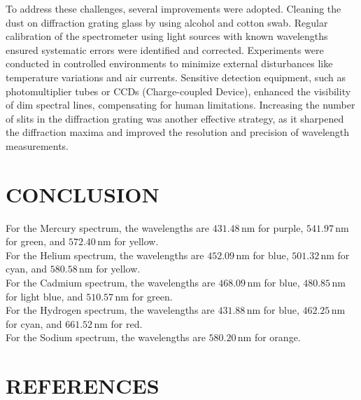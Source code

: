 \documentclass[a4paper,11pt]{article}
\begin{document}
To address these challenges, several improvements were adopted. Cleaning the dust on diffraction grating glass by using alcohol and cotton swab. Regular calibration of the spectrometer using light sources with known wavelengths ensured systematic errors were identified and corrected. Experiments were conducted in controlled environments to minimize external disturbances like temperature variations and air currents. Sensitive detection equipment, such as photomultiplier tubes or CCDs (Charge-coupled Device), enhanced the visibility of dim spectral lines, compensating for human limitations. Increasing the number of slits in the diffraction grating was another effective strategy, as it sharpened the diffraction maxima and improved the resolution and precision of wavelength measurements.\\

\newpage
\section*{\center CONCLUSION}
\label{sec:CONCLUSION}
\noindent
\qquad For the Mercury spectrum, the wavelengths are \(431.48 \, \text{nm}\) for purple, \(541.97 \, \text{nm}\) for green, and \(572.40 \, \text{nm}\) for yellow. \\

\quad For the Helium spectrum, the wavelengths are \(452.09 \, \text{nm}\) for blue, \(501.32 \, \text{nm}\) for cyan, and \(580.58 \, \text{nm}\) for yellow. \\

\quad For the Cadmium spectrum, the wavelengths are \(468.09 \, \text{nm}\) for blue, \(480.85 \, \text{nm}\) for light blue, and \(510.57 \, \text{nm}\) for green. \\

\quad For the Hydrogen spectrum, the wavelengths are \(431.88 \, \text{nm}\) for blue, \(462.25 \, \text{nm}\) for cyan, and \(661.52 \, \text{nm}\) for red. \\

\quad For the Sodium spectrum, the wavelengths are \(580.20 \, \text{nm}\) for orange. \\

\newpage
\section*{\center REFERENCES}
\label{sec:REFERENCES}
\end{document}
